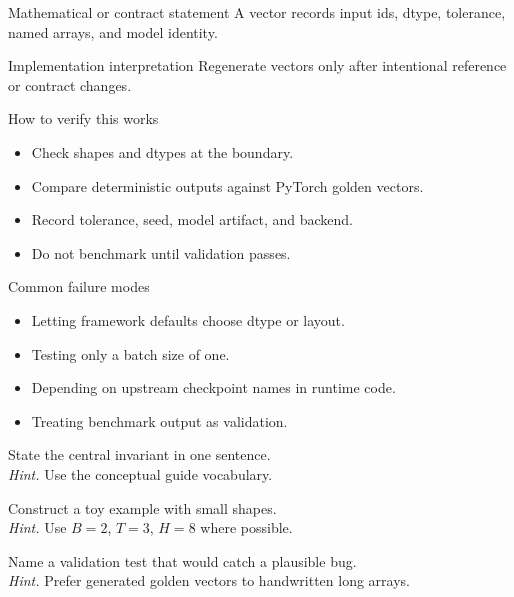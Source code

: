 \begin{definitionbox}{Mathematical or contract statement}
A vector records input ids, dtype, tolerance, named arrays, and model identity.
\end{definitionbox}

\begin{implementationbox}{Implementation interpretation}
Regenerate vectors only after intentional reference or contract changes.
\end{implementationbox}

\begin{verificationbox}{How to verify this works}
\begin{itemize}
\item Check shapes and dtypes at the boundary.
\item Compare deterministic outputs against PyTorch golden vectors.
\item Record tolerance, seed, model artifact, and backend.
\item Do not benchmark until validation passes.
\end{itemize}
\end{verificationbox}

\begin{warningbox}{Common failure modes}
\begin{itemize}
\item Letting framework defaults choose dtype or layout.
\item Testing only a batch size of one.
\item Depending on upstream checkpoint names in runtime code.
\item Treating benchmark output as validation.
\end{itemize}
\end{warningbox}

\begin{chapterexercises}
\item State the central invariant in one sentence.\\
\textit{Hint.} Use the conceptual guide vocabulary.
\item Construct a toy example with small shapes.\\
\textit{Hint.} Use $B=2$, $T=3$, $H=8$ where possible.
\item Name a validation test that would catch a plausible bug.\\
\textit{Hint.} Prefer generated golden vectors to handwritten long arrays.
\end{chapterexercises}


